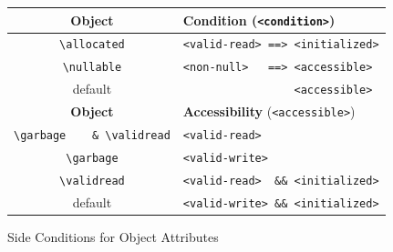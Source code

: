 \begin{figure}[htbp]
\begin{center}
  \begin{tabular}{|c|l|}
    \hline
    \textbf{Object}   & \textbf{Condition} (\verb+<condition>+)\\
    \hline
    \verb+\allocated+ & \verb+<valid-read> ==> <initialized>+ \\
    \verb+\nullable+  & \verb+<non-null>   ==> <accessible>+ \\
    default           & \verb+                 <accessible>+ \\
    \hline
    \textbf{Object}   & \textbf{Accessibility} (\verb+<accessible>+)\\
    \hline
    \verb+\garbage    & \validread+   & \verb+<valid-read>+ \\
    \verb+\garbage+   & \verb+<valid-write>+ \\
    \verb+\validread+ & \verb+<valid-read>  && <initialized>+ \\
    default           & \verb+<valid-write> && <initialized>+ \\
    \hline
  \end{tabular}
\end{center}
\caption{Side Conditions for Object Attributes}
\label{fig:object-attributes}
\end{figure}

